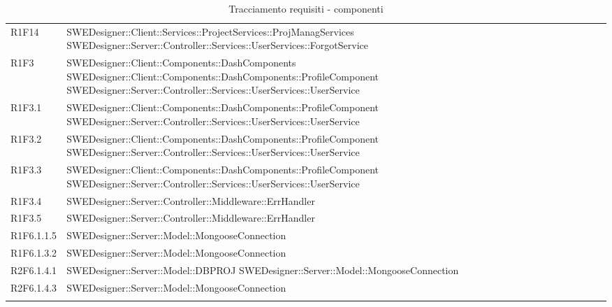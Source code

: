 \begin{center}
\begin{longtable}{p{2cm}!{\VRule[1pt]}p{14cm}}
R1F14 & SWEDesigner::Client::Services::ProjectServices::ProjManagServices \newline SWEDesigner::Server::Controller::Services::UserServices::ForgotService \\
R1F3 & SWEDesigner::Client::Components::DashComponents \newline SWEDesigner::Client::Components::DashComponents::ProfileComponent \newline SWEDesigner::Server::Controller::Services::UserServices::UserService \\
R1F3.1 & SWEDesigner::Client::Components::DashComponents::ProfileComponent \newline SWEDesigner::Server::Controller::Services::UserServices::UserService \\
R1F3.2 & SWEDesigner::Client::Components::DashComponents::ProfileComponent \newline SWEDesigner::Server::Controller::Services::UserServices::UserService \\
R1F3.3 & SWEDesigner::Client::Components::DashComponents::ProfileComponent \newline SWEDesigner::Server::Controller::Services::UserServices::UserService \\
R1F3.4 & SWEDesigner::Server::Controller::Middleware::ErrHandler \\
R1F3.5 & SWEDesigner::Server::Controller::Middleware::ErrHandler \\
R1F6.1.1.5 & SWEDesigner::Server::Model::MongooseConnection \\
R1F6.1.3.2 & SWEDesigner::Server::Model::MongooseConnection \\
R2F6.1.4.1 & SWEDesigner::Server::Model::DBPROJ \newline SWEDesigner::Server::Model::MongooseConnection \\
R2F6.1.4.3 & SWEDesigner::Server::Model::MongooseConnection \\

\caption{Tracciamento requisiti - componenti}
\end{longtable}
\end{center}